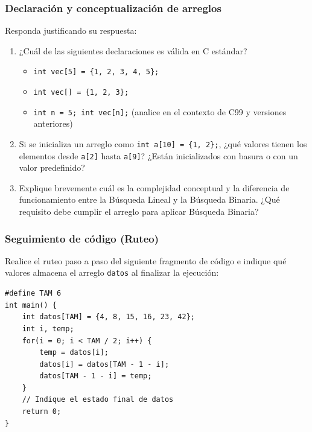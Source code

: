 \begin{ejercicioClase}
    \subsubsection{Declaración y conceptualización de arreglos}
    Responda justificando su respuesta:
    \begin{enumerate}[label=\alph*)]
        \item ¿Cuál de las siguientes declaraciones es válida en C estándar?
        \begin{itemize}
            \item \texttt{int vec[5] = \{1, 2, 3, 4, 5\};}
            \item \texttt{int vec[] = \{1, 2, 3\};}
            \item \texttt{int n = 5; int vec[n];} (analice en el contexto de C99 y versiones anteriores)
        \end{itemize}
        \item Si se inicializa un arreglo como \texttt{int a[10] = \{1, 2\};}, ¿qué valores tienen los elementos desde \texttt{a[2]} hasta \texttt{a[9]}? ¿Están inicializados con basura o con un valor predefinido?
        \item Explique brevemente cuál es la complejidad conceptual y la diferencia de funcionamiento entre la Búsqueda Lineal y la Búsqueda Binaria. ¿Qué requisito debe cumplir el arreglo para aplicar Búsqueda Binaria?
    \end{enumerate}

    \subsubsection{Seguimiento de código (Ruteo)}
    Realice el ruteo paso a paso del siguiente fragmento de código e indique qué valores almacena el arreglo \texttt{datos} al finalizar la ejecución:
    \begin{lstlisting}[style=customc, basicstyle=\ttfamily\small]
#define TAM 6
int main() {
    int datos[TAM] = {4, 8, 15, 16, 23, 42};
    int i, temp;
    for(i = 0; i < TAM / 2; i++) {
        temp = datos[i];
        datos[i] = datos[TAM - 1 - i];
        datos[TAM - 1 - i] = temp;
    }
    // Indique el estado final de datos
    return 0;
}
    \end{lstlisting}


\end{ejercicioClase}
